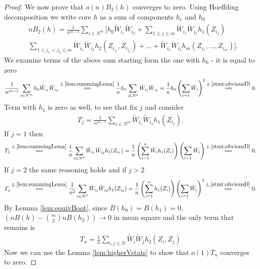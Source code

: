 \begin{proof}
We now prove that $o(n) B_2(h)$ converges to zero. Using Hoeffding decomposition  we write core  $h$ as a sum of components $h_c$ and $h_0$  
\begin{align}
\label{eq:bootstrapedOne}
 &n B_2(h) = \frac{1} {n^{m-1}}  \sum_{i \in N^m}  \Big[h_0  \tilde W_{i_1} \tilde W_{i_2} + \sum_{1 \leq j \leq m } \tilde W_{i_1} \tilde W_{i_2} h_1(Z_{i_j})    \\ 
 &\sum_{1 \leq j_1 < j_2 \leq m } \tilde W_{i_1} \tilde W_{i_2} h_2(Z_{i_{j_1}},Z_{i_{j_2}}) + ... +  \tilde W_{i_1} \tilde W_{i_2}   h_m(Z_{i_1},...,Z_{i_m}) \Big].
\end{align}
We examine terms of the above sum starting form the one with $h_0$ - it is equal to zero
\begin{align*}
\frac{1} {n^{m-1}}  \sum_{i \in N^m}  h_0  \tilde W_{i_1} \tilde W_{i_2}   \overset{L.\ref{lem:summingLema}}{=\joinrel=} \frac 1 n h_0 \sum_{i \in N^2} \tilde W_{i_1} \tilde W_{i_2} = \frac 1 n h_0 \left( \sum_{i=1} \tilde W_i \right)^2  \overset{L.\ref{stmt:obviousD}}{=\joinrel=} 0.
\end{align*}  
Term with $h_1$ is zero as well, to see that fix $j$ and consider 
\begin{align*}
T_{j} = \frac{1} {n^{m-1}}  \sum_{i \in N^m}  \tilde W_{i_1} \tilde W_{i_2} h_1(Z_{i_j}).  
\end{align*}  
If $j=1$ then
\begin{align*}
T_{1} \overset{L.\ref{lem:summingLema}}{=\joinrel=} \frac{1} {n}  \sum_{i \in N^2}  \tilde W_{i_1} \tilde W_{i_2} h_1(Z_{i_1}) =  \frac{1} {n}  \left( \sum_{i=1}^n  \tilde W_i h_1(Z_i) \right) \left( \sum_{i=1} \tilde W_i \right) \overset{L.\ref{stmt:obviousD}}{=\joinrel=} 0.
\end{align*}
If $j=2$ the same reasoning holds and if $j>2$
\begin{align*}
T_{j} \overset{L.\ref{lem:summingLema}}{=\joinrel=} \frac{1} {n^2}  \sum_{i \in N^3}  \tilde W_{i_1} \tilde W_{i_2} h_1(Z_{i_3}) =  \frac{1} {n}  \left( \sum_{i=1}^n h_1(Z_i) \right) \left( \sum_{i=1} \tilde W_i \right)^2 \overset{L.\ref{stmt:obviousD}}{=\joinrel=} 0.
\end{align*}
By Lemma \ref{lem:equivBoot}, since $B(h_0)=B(h_1)=0$, $(nB(h) - \binom m 2 nB(h_2)) \to 0$ in mean square and the only term that remains is 
\begin{align*}
T_n = \frac{1} {n}  \sum_{i,j \in N}  \tilde W_{i} \tilde W_j h_2(Z_i,Z_j)
\end{align*}
 Now we can use the Lemma \ref{lem:higherVstats} to show that $o(1) T_n$ converges to zero. 
 \end{proof}



